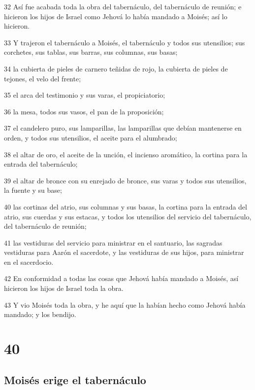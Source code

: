 \par 32 Así fue acabada toda la obra del tabernáculo, del tabernáculo de reunión; e hicieron los hijos de Israel como Jehová lo había mandado a Moisés; así lo hicieron.
\par 33 Y trajeron el tabernáculo a Moisés, el tabernáculo y todos sus utensilios; sus corchetes, sus tablas, sus barras, sus columnas, sus basas;
\par 34 la cubierta de pieles de carnero teñidas de rojo, la cubierta de pieles de tejones, el velo del frente;
\par 35 el arca del testimonio y sus varas, el propiciatorio;
\par 36 la mesa, todos sus vasos, el pan de la proposición;
\par 37 el candelero puro, sus lamparillas, las lamparillas que debían mantenerse en orden, y todos sus utensilios, el aceite para el alumbrado;
\par 38 el altar de oro, el aceite de la unción, el incienso aromático, la cortina para la entrada del tabernáculo;
\par 39 el altar de bronce con su enrejado de bronce, sus varas y todos sus utensilios, la fuente y su base;
\par 40 las cortinas del atrio, sus columnas y sus basas, la cortina para la entrada del atrio, sus cuerdas y sus estacas, y todos los utensilios del servicio del tabernáculo, del tabernáculo de reunión;
\par 41 las vestiduras del servicio para ministrar en el santuario, las sagradas vestiduras para Aarón el sacerdote, y las vestiduras de sus hijos, para ministrar en el sacerdocio.
\par 42 En conformidad a todas las cosas que Jehová había mandado a Moisés, así hicieron los hijos de Israel toda la obra.
\par 43 Y vio Moisés toda la obra, y he aquí que la habían hecho como Jehová había mandado; y los bendijo.

\chapter{40}

\section*{Moisés erige el tabernáculo}

